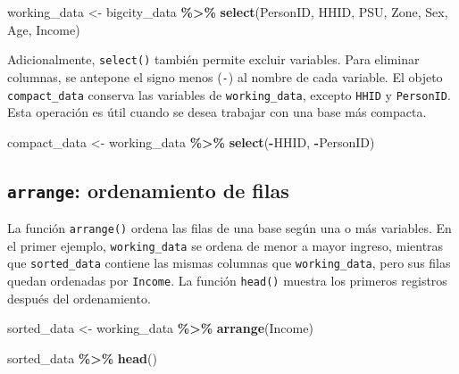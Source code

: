 \documentclass[
  spanish,
  12pt,
]{book}
\newenvironment{Shaded}{\begin{snugshade}}{\end{snugshade}}
\newcommand{\FunctionTok}[1]{\textcolor[rgb]{0.13,0.29,0.53}{\textbf{#1}}}
\newcommand{\NormalTok}[1]{#1}
\newcommand{\OtherTok}[1]{\textcolor[rgb]{0.56,0.35,0.01}{#1}}
\newcommand{\SpecialCharTok}[1]{\textcolor[rgb]{0.81,0.36,0.00}{\textbf{#1}}}
\begin{document}
\begin{Shaded}
\begin{Highlighting}[]
\NormalTok{working\_data }\OtherTok{\textless{}{-}}\NormalTok{ bigcity\_data }\SpecialCharTok{\%\textgreater{}\%}
  \FunctionTok{select}\NormalTok{(PersonID, HHID, PSU, Zone, Sex, Age, Income)}
\end{Highlighting}
\end{Shaded}

Adicionalmente, \texttt{select()} también permite excluir variables. Para eliminar columnas, se antepone el signo menos (\texttt{-}) al nombre de cada variable. El objeto \texttt{compact\_data} conserva las variables de \texttt{working\_data}, excepto \texttt{HHID} y \texttt{PersonID}. Esta operación es útil cuando se desea trabajar con una base más compacta.

\begin{Shaded}
\begin{Highlighting}[]
\NormalTok{compact\_data }\OtherTok{\textless{}{-}}\NormalTok{ working\_data }\SpecialCharTok{\%\textgreater{}\%}
  \FunctionTok{select}\NormalTok{(}\SpecialCharTok{{-}}\NormalTok{HHID, }\SpecialCharTok{{-}}\NormalTok{PersonID)}
\end{Highlighting}
\end{Shaded}

\subsection{\texorpdfstring{\texttt{arrange}: ordenamiento de filas}{arrange: ordenamiento de filas}}\label{arrange-ordenamiento-de-filas}

La función \texttt{arrange()} ordena las filas de una base según una o más variables. En el primer ejemplo, \texttt{working\_data} se ordena de menor a mayor ingreso, mientras que \texttt{sorted\_data} contiene las mismas columnas que \texttt{working\_data}, pero sus filas quedan ordenadas por \texttt{Income}. La función \texttt{head()} muestra los primeros registros después del ordenamiento.

\begin{Shaded}
\begin{Highlighting}[]
\NormalTok{sorted\_data }\OtherTok{\textless{}{-}}\NormalTok{ working\_data }\SpecialCharTok{\%\textgreater{}\%}
  \FunctionTok{arrange}\NormalTok{(Income)}

\NormalTok{sorted\_data }\SpecialCharTok{\%\textgreater{}\%}
  \FunctionTok{head}\NormalTok{()}
\end{Highlighting}
\end{Shaded}
\end{document}
